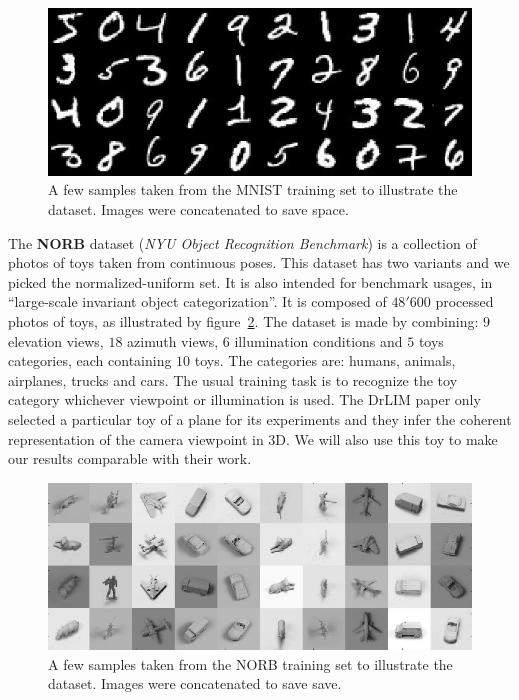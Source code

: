 \documentclass[a4paper,12pt]{report}
\begin{document}
\begin{figure}[t]
    \begin{center}
        \includegraphics{thesis_figures/mnist.jpg}
    \end{center}
    \caption{A few samples taken from the MNIST training set to illustrate the dataset. Images were concatenated to save space.}
    \label{fig:mnist}
\end{figure}

The {\bf NORB} dataset ({\em NYU Object Recognition Benchmark}) is a collection of photos of toys taken from continuous poses.
This dataset has two variants and we picked the normalized-uniform set.
It is also intended for benchmark usages, in ``large-scale invariant object categorization''.
It is composed of $48'600$ processed photos of toys, as illustrated by figure~\ref{fig:norb}.
The dataset is made by combining: $9$ elevation views, $18$ azimuth views, $6$ illumination conditions and $5$ toys categories, each containing $10$ toys.
The categories are: humans, animals, airplanes, trucks and cars.
The usual training task is to recognize the toy category whichever viewpoint or illumination is used.
The DrLIM paper only selected a particular toy of a plane for its experiments and they infer the coherent representation of the camera viewpoint in 3D.
We will also use this toy to make our results comparable with their work.

\begin{figure}[t]
    \begin{center}
        \includegraphics{thesis_figures/norb.jpg}
    \end{center}
    \caption{A few samples taken from the NORB training set to illustrate the dataset. Images were concatenated to save save.}
    \label{fig:norb}
\end{figure}
\end{document}

